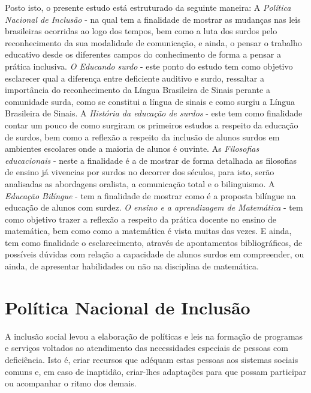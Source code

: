 \documentclass[brasil]{abnt}
\begin{document}
	Posto isto, o presente estudo está estruturado da seguinte maneira: A \textit{Política Nacional de Inclusão} - na qual tem a finalidade de mostrar as mudanças nas leis brasileiras ocorridas ao logo dos 
	tempos, bem como a luta dos surdos pelo reconhecimento da sua modalidade de comunicação, e ainda, o pensar o trabalho educativo desde os diferentes campos do conhecimento de forma a pensar a prática 
	inclusiva. \textit{O Educando surdo} - este ponto do estudo tem como objetivo esclarecer qual a diferença entre deficiente auditivo e surdo, ressaltar a importância do reconhecimento da Língua Brasileira de Sinais 
	perante a comunidade surda, como se constitui a língua de sinais e como surgiu a Língua Brasileira de Sinais. A \textit{História da educação de surdos} - este tem como finalidade contar um pouco 
	de como surgiram os primeiros estudos a respeito da educação de surdos, bem como a reflexão a respeito da inclusão de alunos surdos em ambientes escolares onde a maioria de alunos é ouvinte. As 
	\textit{Filosofias educacionais} - neste a finalidade é a de mostrar de forma detalhada as filosofias de ensino já vivencias por surdos no decorrer dos séculos, para isto, serão analisadas as abordagens oralista, 
	a comunicação total e o bilinguismo. A \textit{Educação Bilíngue} - tem a finalidade de mostrar como é a proposta bilíngue na educação de alunos com surdez. \textit{O ensino e a aprendizagem de Matemática} - tem como 
	objetivo trazer a reflexão a respeito da prática docente no ensino de matemática, bem como como a matemática é vista muitas das vezes. E ainda, tem como finalidade o esclarecimento, através de apontamentos bibliográficos, de possíveis
	dúvidas com relação a capacidade de alunos surdos em compreender, ou ainda, de apresentar habilidades ou não na disciplina de matemática.  

\chapter{Política Nacional de Inclusão}
	A inclusão social levou a elaboração de políticas e leis na formação de programas e serviços voltados ao atendimento das necessidades especiais de pessoas com deficiência. Isto é, criar recursos que 
	adéquam estas pessoas aos sistemas sociais comuns e, em caso de inaptidão, criar-lhes adaptações para que possam participar ou acompanhar o ritmo dos demais. 
	
\end{document}
